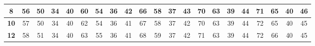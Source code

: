 \begin{table}[H]
{\begin{tabular}{|c|c|c|c|c|c|c|c|c|c|c|c|c|c|c|c|c|c|c|c|c|}
            \textbf{8}         & 56                                   & 50                                   & 34                                   & 40                                    & 60                                    & 54          & 36         & 42          & 66         & 58          & 37         & 43          & 70         & 63          & 39         & 44          & 71         & 65          & 40         & 46          \\ \hline
            \textbf{10}        & 57                                   & 50                                   & 34                                   & 40                                    & 62                                    & 54          & 36         & 41          & 67         & 58          & 37         & 42          & 70         & 63          & 39         & 44          & 72         & 65          & 40         & 45          \\ \hline
            \textbf{12}        & 58                                   & 51                                   & 34                                   & 40                                    & 63                                    & 55          & 36         & 41          & 68         & 59          & 37         & 42          & 71         & 63          & 39         & 44          & 72         & 66          & 40         & 45          \\ \hline
        \end{tabular}
    }
\end{table}

